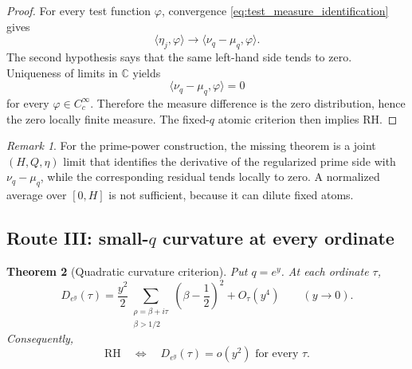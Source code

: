 \documentclass[11pt]{amsart}
\numberwithin{equation}{section}
\theoremstyle{plain}
\newtheorem{theorem}{Theorem}[section]
\theoremstyle{definition}
\theoremstyle{remark}
\newtheorem{remark}[theorem]{Remark}
\newcommand{\RH}{\mathrm{RH}}
\newcommand{\1}{\mathbf{1}}
\begin{document}
\begin{proof}
For every test function \(\varphi\), convergence
\eqref{eq:test_measure_identification} gives
\begin{equation}
\langle\eta_j,\varphi\rangle
\longrightarrow
\langle\nu_q-\mu_q,\varphi\rangle.
\label{eq:test_measure_limit_first}
\end{equation}
The second hypothesis says that the same left-hand side tends to zero.
Uniqueness of limits in \(\mathbb C\) yields
\begin{equation}
\langle\nu_q-\mu_q,\varphi\rangle=0
\label{eq:test_measure_limit_zero}
\end{equation}
for every \(\varphi\in C_c^\infty\).  Therefore the measure difference is
the zero distribution, hence the zero locally finite measure.  The
fixed-\(q\) atomic criterion then implies \(\RH\).
\end{proof}

\begin{remark}
\label{rem:route_distributional_missing}
For the prime-power construction, the missing theorem is a joint
\((H,Q,\eta)\) limit that identifies the derivative of the regularized
prime side with \(\nu_q-\mu_q\), while the corresponding residual tends
locally to zero.  A normalized average over \([0,H]\) is not sufficient,
because it can dilute fixed atoms.
\end{remark}

\subsection{Route III: small-\(q\) curvature at every ordinate}
\label{subsec:route_small_q}

\begin{theorem}[Quadratic curvature criterion]
\label{thm:small_q_curvature}
Put \(q=e^y\).  At each ordinate \(\tau\),
\begin{equation}
D_{e^y}(\tau)
=
\frac{y^2}{2}
\sum_{\substack{\rho=\beta+i\tau\\\beta>1/2}}
\left(\beta-\frac12\right)^2
+
O_\tau(y^4)
\qquad(y\to0).
\label{eq:small_q_curvature_expansion}
\end{equation}
Consequently,
\begin{equation}
\RH
\quad\Longleftrightarrow\quad
D_{e^y}(\tau)=o(y^2)
\text{ for every }\tau.
\label{eq:small_q_curvature_criterion}
\end{equation}
\end{theorem}
\end{document}
